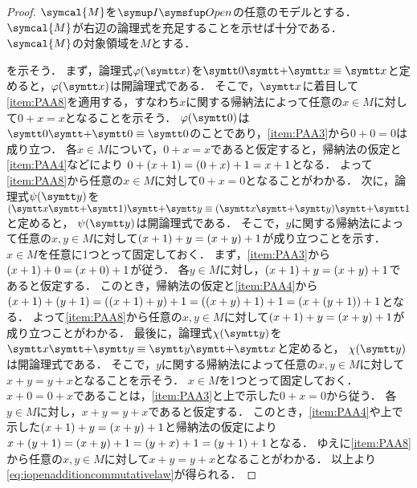 \begin{proof}
	\(\symcal{M}\)を\(\OpenFormulaInduction\)の任意のモデルとする．\(\symcal{M}\)が右辺の論理式を充足することを示せば十分である．
	\(\symcal{M}\)の対象領域を\(M\)とする．

	を示そう．
	まず，論理式\(\apply{\varphi}{\obj{x}}\)を\(\obj{0} \obj{+} \obj{x} \objeq \obj{x}\)と定めると，\(\apply{\varphi}{\obj{x}}\)は開論理式である．
	そこで，\(\obj{x}\)に着目して\cref{item:PAA8}を適用する，すなわち\(x\)に関する帰納法によって任意の\(x \in M\)に対して\(0 + x = x\)となることを示そう．
	\(\apply{\varphi}{\obj{0}}\)は\(\obj{0} \obj{+} \obj{0} \objeq \obj{0}\)のことであり，\cref{item:PAA3}から\(0 + 0 = 0\)は成り立つ．
	各\(x \in M\)について，\(0 + x = x\)であると仮定すると，帰納法の仮定と\cref{item:PAA4}などにより
	\(0 + \paren{x + 1} = \paren{0 + x} + 1 = x + 1\)となる．
	よって\cref{item:PAA8}から任意の\(x \in M\)に対して\(0 + x = 0\)となることがわかる．
	次に，論理式\(\apply{\psi}{\obj{y}}\)を\(\paren{\obj{x} \obj{+} \obj{1}} \obj{+} \obj{y} \objeq \paren{\obj{x} \obj{+} \obj{y}} \obj{+} \obj{1}\)と定めると，
	\(\apply{\psi}{\obj{y}}\)は開論理式である．
	そこで，\(y\)に関する帰納法によって任意の\(x, y \in M\)に対して\(\paren{x + 1} + y = \paren{x + y} + 1\)が成り立つことを示す．
	\(x \in M\)を任意に1つとって固定しておく．
	まず，\cref{item:PAA3}から\(\paren{x + 1} + 0 = \paren{x + 0} + 1\)が従う．
	各\(y \in M\)に対し，\(\paren{x + 1} + y = \paren{x + y} + 1\)であると仮定する．
	このとき，帰納法の仮定と\cref{item:PAA4}から
	\(\paren{x + 1} + \paren{y + 1} = \paren{\paren{x + 1} + y} + 1 = \paren{\paren{x + y} + 1} + 1 = \paren{x + \paren{y + 1}} + 1\)となる．
	よって\cref{item:PAA8}から任意の\(x, y \in M\)に対して\(\paren{x + 1} + y = \paren{x + y} + 1\)が成り立つことがわかる．
	最後に，論理式\(\apply{\chi}{\obj{y}}\)を\(\obj{x} \obj{+} \obj{y} \objeq \obj{y} \obj{+} \obj{x}\)と定めると，
	\(\apply{\chi}{\obj{y}}\)は開論理式である．
	そこで，\(y\)に関する帰納法によって任意の\(x, y \in M\)に対して\(x + y = y + x\)となることを示そう．
	\(x \in M\)を1つとって固定しておく．
	\(x + 0 = 0 + x\)であることは，\cref{item:PAA3}と上で示した\(0 + x = 0\)から従う．
	各\(y \in M\)に対し，\(x + y = y + x\)であると仮定する．
	このとき，\cref{item:PAA4}や上で示した\(\paren{x + 1} + y = \paren{x + y} + 1\)と帰納法の仮定により
	\(x + \paren{y + 1} = \paren{x + y} + 1 = \paren{y + x} + 1 = \paren{y + 1} + 1\)となる．
	ゆえに\cref{item:PAA8}から任意の\(x, y \in M\)に対して\(x + y = y + x\)となることがわかる．
	以上より\cref{eq:iopenadditioncommutativelaw}が得られる．


\end{proof}
